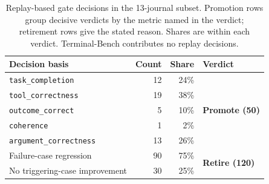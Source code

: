 \documentclass[11pt,letterpaper]{article}
\begin{document}
\begin{table}[H]
\centering\small
\caption{Replay-based gate decisions in the 13-journal subset. Promotion rows group decisive verdicts by the metric named in the verdict; retirement rows give the stated reason. Shares are within each verdict. Terminal-Bench contributes no replay decisions.}
\label{tab:replay-decisions}
\begin{tabular*}{\linewidth}{@{\extracolsep{\fill}}lrrl@{}}
\toprule
Decision basis & Count & Share & Verdict \\
\midrule
\texttt{task\_completion} & 12 & 24\% & \multirow{5}{*}{\textbf{Promote (50)}} \\
\texttt{tool\_correctness} & 19 & 38\% &  \\
\texttt{outcome\_correct} & 5 & 10\% &  \\
\texttt{coherence} & 1 & 2\% &  \\
\texttt{argument\_correctness} & 13 & 26\% &  \\
\midrule
Failure-case regression & 90 & 75\% & \multirow{2}{*}{\textbf{Retire (120)}} \\
No triggering-case improvement & 30 & 25\% &  \\
\bottomrule
\end{tabular*}
\end{table}
\end{document}
